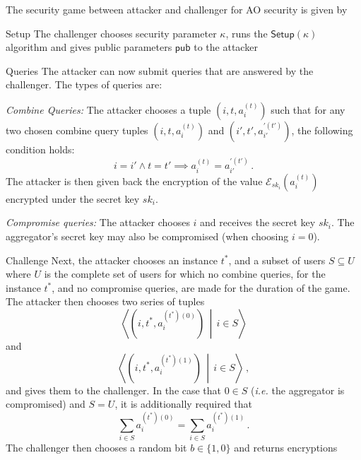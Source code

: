 \documentclass[10pt,letterpaper,oneside,twocolumn,journal]{IEEEtran}
\theoremstyle{definition}
\theoremstyle{definition}
\theoremstyle{remark}
\begin{document}
The security game between attacker and challenger for AO security is given by
\begin{LaTeXdescription}
    \item[Setup] The challenger chooses security parameter $\kappa$, runs the $\mathsf{Setup}(\kappa)$ algorithm and gives public parameters $\mathsf{pub}$ to the attacker
    \item[Queries] The attacker can now submit queries that are answered by the challenger. The types of queries are:
    \begin{LaTeXenumerate}
        \item \textit{Combine Queries:} The attacker chooses a tuple $(i,t,a^{(t)}_i)$ such that for any two chosen combine query tuples $(i,t,a^{(t)}_i)$ and $(i',t',a^{\prime(t')}_{i'})$, the following condition holds:
        \begin{equation*}
            i = i' \wedge t = t' \implies a^{(t)}_{i} = a^{\prime(t')}_{i'}\,.
        \end{equation*}
        The attacker is then given back the encryption of the value $\mathcal{E}_{sk_i}(a^{(t)}_i)$ encrypted under the secret key $sk_i$.
        \item \textit{Compromise queries:} The attacker chooses $i$ and receives the secret key $sk_i$. The aggregator's secret key may also be compromised (when choosing $i=0$).
    \end{LaTeXenumerate} 
    \item[Challenge] Next, the attacker chooses an instance $t^*$, and a subset of users $S \subseteq U$ where $U$ is the complete set of users for which no combine queries, for the instance $t^*$, and no compromise queries, are made for the duration of the game. The attacker then chooses two series of tuples
    \begin{equation*}
        \left\langle(i,t^*,a^{(t^*)(0)}_i)\,\middle|\,i \in S\right\rangle
    \end{equation*}
    and
    \begin{equation*}
        \left\langle(i,t^*,a^{(t^*)(1)}_i)\,\middle|\, i \in S\right\rangle\,,
    \end{equation*}
    and gives them to the challenger. In the case that $0 \in S$ (\textit{i.e.} the aggregator is compromised) and $S = U$, it is additionally required that
    \begin{equation*}
        \sum_{i\in S} a^{(t^*)(0)}_i = \sum_{i \in S} a^{(t^*)(1)}_i\,.
    \end{equation*}
    The challenger then chooses a random bit $b \in \{1,0\}$ and returns encryptions 

\end{LaTeXdescription}
\end{document}
